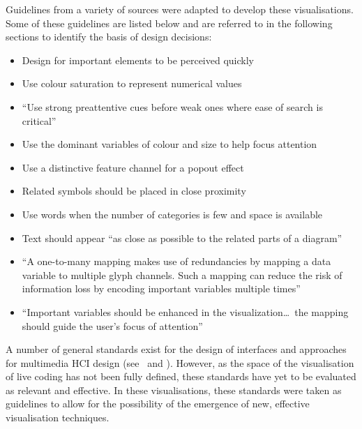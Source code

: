 Guidelines from a variety of sources were adapted to develop these visualisations. Some of these guidelines are listed below and are referred to in the following sections to identify the basis of design decisions:
\begin{itemize}
\item Design for important elements to be perceived quickly \cite[p.~14]{Ware2013a}~
\item Use colour saturation to represent numerical values \cite[p.~117]{Ware2013a}~
\item ``Use strong preattentive cues before weak ones where ease of search is critical'' \cite[p.~156]{Ware2013a}~
\item Use the dominant variables of colour and size to help focus attention \cite[p.~45]{Borgo2013}~
\item Use a distinctive feature channel for a popout effect \cite[p.~157]{Ware2013a}~
\item Related symbols should be placed in close proximity \cite[p.~181]{Ware2013a}~
\item Use words when the number of categories is few and space is available \cite[p.~321]{Ware2013a}~
\item Text should appear ``as close as possible to the related parts of a diagram'' \cite[p.~333]{Ware2013a}~
\item ``A one-to-many mapping makes use of redundancies by mapping a data variable to multiple glyph channels. Such a mapping can reduce the risk of information loss by encoding important variables multiple times'' \cite[p.~52]{Borgo2013}~
\item ``Important variables should be enhanced in the visualization\ldots~the mapping should guide the user's focus of attention'' \cite[p.~52]{Borgo2013}~
\end{itemize}

A number of general standards exist for the design of interfaces and approaches for multimedia \ac{HCI} design (see~\cite{ISO2002} and \cite{Bevan2006}). However, as the space of the visualisation of live coding has not been fully defined, these standards have yet to be evaluated as relevant and effective. In these visualisations, these standards were taken as guidelines to allow for the possibility of the emergence of new, effective visualisation techniques.


